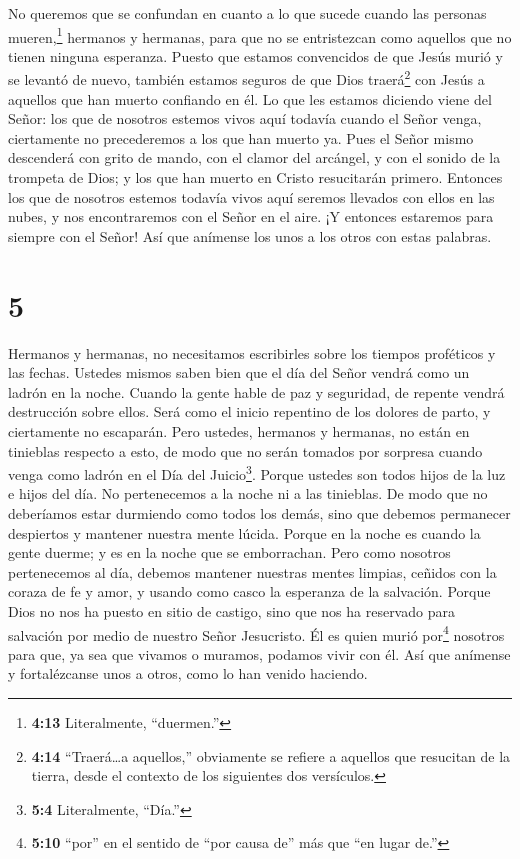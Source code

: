  No queremos que se confundan en cuanto a lo que sucede
cuando las personas mueren,\footnote{\textbf{4:13} Literalmente,
  ``duermen.''} hermanos y hermanas, para que no se entristezcan como
aquellos que no tienen ninguna esperanza.  Puesto que
estamos convencidos de que Jesús murió y se levantó de nuevo, también
estamos seguros de que Dios traerá\footnote{\textbf{4:14}
  ``Traerá\ldots a aquellos,'' obviamente se refiere a aquellos que
  resucitan de la tierra, desde el contexto de los siguientes dos
  versículos.} con Jesús a aquellos que han muerto confiando en él.
 Lo que les estamos diciendo viene del Señor: los que de
nosotros estemos vivos aquí todavía cuando el Señor venga, ciertamente
no precederemos a los que han muerto ya.  Pues el Señor
mismo descenderá con grito de mando, con el clamor del arcángel, y con
el sonido de la trompeta de Dios; y los que han muerto en Cristo
resucitarán primero.  Entonces los que de nosotros estemos
todavía vivos aquí seremos llevados con ellos en las nubes, y nos
encontraremos con el Señor en el aire. ¡Y entonces estaremos para
siempre con el Señor!  Así que anímense los unos a los
otros con estas palabras.

\hypertarget{section-4}{%
\section{5}\label{section-4}}

 Hermanos y hermanas, no necesitamos escribirles sobre los
tiempos proféticos y las fechas.  Ustedes mismos saben bien
que el día del Señor vendrá como un ladrón en la noche. 
Cuando la gente hable de paz y seguridad, de repente vendrá destrucción
sobre ellos. Será como el inicio repentino de los dolores de parto, y
ciertamente no escaparán.  Pero ustedes, hermanos y
hermanas, no están en tinieblas respecto a esto, de modo que no serán
tomados por sorpresa cuando venga como ladrón en el Día del
Juicio\footnote{\textbf{5:4} Literalmente, ``Día.''}. 
Porque ustedes son todos hijos de la luz e hijos del día. No
pertenecemos a la noche ni a las tinieblas.  De modo que no
deberíamos estar durmiendo como todos los demás, sino que debemos
permanecer despiertos y mantener nuestra mente lúcida. 
Porque en la noche es cuando la gente duerme; y es en la noche que se
emborrachan.  Pero como nosotros pertenecemos al día,
debemos mantener nuestras mentes limpias, ceñidos con la coraza de fe y
amor, y usando como casco la esperanza de la salvación. 
Porque Dios no nos ha puesto en sitio de castigo, sino que nos ha
reservado para salvación por medio de nuestro Señor Jesucristo.
 Él es quien murió por\footnote{\textbf{5:10} ``por'' en el
  sentido de ``por causa de'' más que ``en lugar de.''} nosotros para
que, ya sea que vivamos o muramos, podamos vivir con él. 
Así que anímense y fortalézcanse unos a otros, como lo han venido
haciendo.

